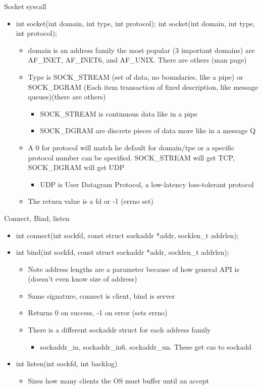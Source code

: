 Socket syscall
\begin{itemize}
    \item int socket(int domain, int type, int protocol); int socket(int domain, int type, int protocol);
    \begin{itemize}
        \item domain is an address family the most popular (3 important domains) are AF\_INET, AF\_INET6, and AF\_UNIX. There are others (man page)
        \item Type is SOCK\_STREAM (set of data, no boundaries, like a pipe) or SOCK\_DGRAM (Each item transaction of fixed description, like message queues)(there are others)
        \begin{itemize}
            \item SOCK\_STREAM is continuous data like in a pipe
            \item SOCK\_DGRAM are discrete pieces of data more like in a message Q
        \end{itemize}
        \item A 0 for protocol will match he default for domain/tpe or a specific protocol number can be specified. SOCK\_STREAM will get TCP, SOCK\_DGRAM will get UDP
        \begin{itemize}
            \item UDP is User Datagram Protocol, a low-latency loss-tolerant protocol
        \end{itemize}
        \item The return value is a fd or -1 (errno set)
    \end{itemize}
\end{itemize}
Connect, Bind, listen
\begin{itemize}
    \item int connect(int sockfd, const struct sockaddr *addr, socklen\_t addrlen);
    \item int bind(int sockfd, const struct sockaddr *addr, socklen\_t addrlen);
    \begin{itemize}
        \item Note address lengths are a parameter because of how general API is (doesn't even know size of address)
        \item Same signature, connect is client, bind is server
        \item Returns 0 on success, -1 on error (sets errno)
        \item There is a different sockaddr struct for each address family
        \begin{itemize}
            \item sockaddr\_in, sockaddr\_in6, sockaddr\_un. These get cas to sockadd
        \end{itemize}
    \end{itemize}
    \item int listen(int sockfd, int backlog)
    \begin{itemize}
        \item Sizes how many clients the OS must buffer until an accept
    \end{itemize}
\end{itemize}
